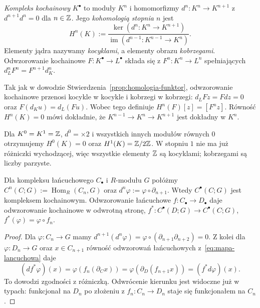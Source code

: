 \begin{definicja}
\label{def:kohomologia-algebraiczna}
\emph{Kompleks kochainowy} $K^\bullet$ to
moduły $K^n$ i homomorfizmy
$d^n:K^n\to K^{n+1}$ z
$d^{n+1}d^n=0$ dla $n\in\mathbb{Z}$. Jego \emph{kohomologią stopnia $n$}
jest
\begin{equation}\label{eq:kohomologia-def}
 H^n(K):=\frac{\ker(d^n:K^n\to K^{n+1})}
 {\operatorname{im}(d^{n-1}:K^{n-1}\to K^n)}.
\end{equation}
Elementy jądra nazywamy \emph{kocyklami},
a elementy obrazu \emph{kobrzegami}.
Odwzorowanie kochainowe $F:K^\bullet\to L^\bullet$
składa się z $F^n:K^n\to L^n$ spełniających
$d_L^nF^n=F^{n+1}d_K^n$.
\end{definicja}

Tak jak w dowodzie
Stwierdzenia~\ref{prop:homologia-funktor},
odwzorowanie kochainowe przenosi kocykle w
kocykle i kobrzegi w kobrzegi:
$d_LFz=Fdz=0$ oraz
$F(d_Ku)=d_L(Fu)$. Wobec tego definiuje
$H^n(F)[z]=[F^nz]$. Równość
$H^n(K)=0$ mówi dokładnie, że
$K^{n-1}\to K^n\to K^{n+1}$
jest dokładny w $K^n$.

\begin{przyklad}
Dla $K^0=K^1=\mathbb{Z}$, $d^0=\times2$
i wszystkich innych modułów równych $0$
otrzymujemy $H^0(K)=0$ oraz
$H^1(K)=\mathbb{Z}/2\mathbb{Z}$. W stopniu $1$ nie ma
już różniczki wychodzącej, więc
wszystkie elementy $\mathbb{Z}$ są kocyklami;
kobrzegami są liczby parzyste.
\end{przyklad}

\begin{stwierdzenie}
\label{prop:kompleks-dualny}
Dla kompleksu łańcuchowego $C_\bullet$
i $R$-modułu $G$ połóżmy
$C^n(C;G):=\operatorname{Hom}_R(C_n,G)$ oraz
$d^n\varphi:=\varphi\circ\partial_{n+1}$.
Wtedy $C^\bullet(C;G)$ jest kompleksem
kochainowym. Odwzorowanie łańcuchowe
$f:C_\bullet\to D_\bullet$ daje odwzorowanie
kochainowe w odwrotną stronę,
$f^*:C^\bullet(D;G)\to C^\bullet(C;G)$,
$f^*(\varphi)=\varphi\circ f_n$.
\end{stwierdzenie}
\begin{proof}
Dla $\varphi:C_n\to G$ mamy
$d^{n+1}(d^n\varphi)
=\varphi\circ(\partial_{n+1}\partial_{n+2})=0$.
Z kolei dla $\varphi:D_n\to G$
oraz $x\in C_{n+1}$ równość odwzorowań łańcuchowych
z~\eqref{eq:mapa-lancuchowa} daje
\[
 (d f^*\varphi)(x)
 =\varphi(f_n(\partial_C x))
 =\varphi(\partial_D(f_{n+1}x))
 =(f^*d\varphi)(x).
\]
To dowodzi zgodności z różniczką.
Odwrócenie kierunku jest widoczne już w typach:
funkcjonał na $D_n$ po złożeniu z $f_n:C_n\to D_n$
staje się funkcjonałem na $C_n$.
\end{proof}

